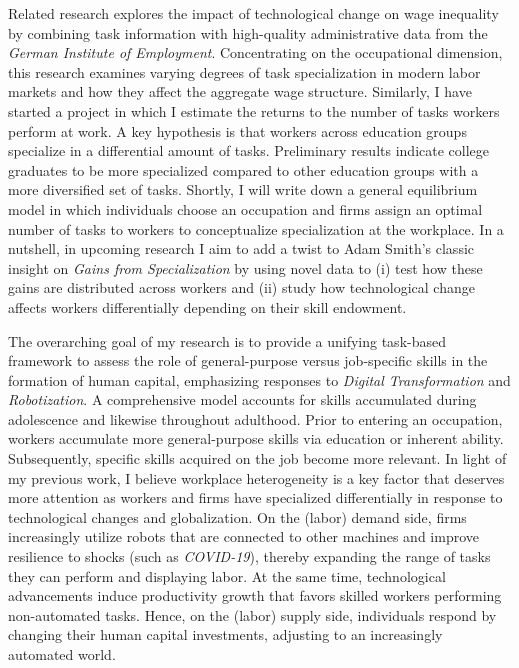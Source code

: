 \documentclass[a4paper,11pt]{article}
\begin{document}
	
	Related research explores the impact of technological change on wage inequality by combining task information with high-quality administrative data from the \textit{German Institute of Employment}. Concentrating on the occupational dimension, this research examines varying degrees of task specialization in modern labor markets and how they affect the aggregate wage structure. Similarly, I have started a project in which I estimate the returns to the number of tasks workers perform at work. A key hypothesis is that workers across education groups specialize in a differential amount of tasks. Preliminary results indicate college graduates to be more specialized compared to other education groups with a more diversified set of tasks. Shortly, I will write down a general equilibrium model in which individuals choose an occupation and firms assign an optimal number of tasks to workers to conceptualize specialization at the workplace. In a nutshell, in upcoming research I aim to add a twist to Adam Smith's classic insight on \textit{Gains from Specialization} by using novel data to (i) test how these gains are distributed across workers and (ii) study how technological change affects workers differentially depending on their skill endowment. 
	
	The overarching goal of my research is to provide a unifying task-based framework to assess the role of general-purpose versus job-specific skills in the formation of human capital, emphasizing responses to \textit{Digital Transformation} and \textit{Robotization}. A comprehensive model accounts for skills accumulated during adolescence and likewise throughout adulthood. Prior to entering an occupation, workers accumulate more general-purpose skills via education or inherent ability. Subsequently, specific skills acquired on the job become more relevant. In light of my previous work, I believe workplace heterogeneity is a key factor that deserves more attention as workers and firms have specialized differentially in response to technological changes and globalization. On the (labor) demand side, firms increasingly utilize robots that are connected to other machines and improve resilience to shocks (such as \textit{COVID-19}), thereby expanding the range of tasks they can perform and displaying labor. At the same time, technological advancements induce productivity growth that favors skilled workers performing non-automated tasks. Hence, on the (labor) supply side, individuals respond by changing their human capital investments, adjusting to an increasingly automated world. 
	
\end{document}
